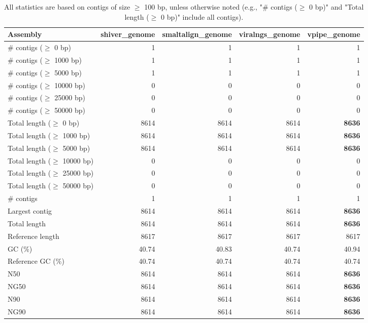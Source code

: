 \documentclass[12pt,a4paper]{article}
\begin{document}
\begin{table}[ht]
\begin{center}
\caption{All statistics are based on contigs of size $\geq$ 100 bp, unless otherwise noted (e.g., "\# contigs ($\geq$ 0 bp)" and "Total length ($\geq$ 0 bp)" include all contigs).}
\begin{tabular}{|l*{4}{|r}|}
\hline
Assembly & shiver\_genome & smaltalign\_genome & viralngs\_genome & vpipe\_genome \\ \hline
\# contigs ($\geq$ 0 bp) & 1 & 1 & 1 & 1 \\ \hline
\# contigs ($\geq$ 1000 bp) & 1 & 1 & 1 & 1 \\ \hline
\# contigs ($\geq$ 5000 bp) & 1 & 1 & 1 & 1 \\ \hline
\# contigs ($\geq$ 10000 bp) & 0 & 0 & 0 & 0 \\ \hline
\# contigs ($\geq$ 25000 bp) & 0 & 0 & 0 & 0 \\ \hline
\# contigs ($\geq$ 50000 bp) & 0 & 0 & 0 & 0 \\ \hline
Total length ($\geq$ 0 bp) & 8614 & 8614 & 8614 & {\bf 8636} \\ \hline
Total length ($\geq$ 1000 bp) & 8614 & 8614 & 8614 & {\bf 8636} \\ \hline
Total length ($\geq$ 5000 bp) & 8614 & 8614 & 8614 & {\bf 8636} \\ \hline
Total length ($\geq$ 10000 bp) & 0 & 0 & 0 & 0 \\ \hline
Total length ($\geq$ 25000 bp) & 0 & 0 & 0 & 0 \\ \hline
Total length ($\geq$ 50000 bp) & 0 & 0 & 0 & 0 \\ \hline
\# contigs & 1 & 1 & 1 & 1 \\ \hline
Largest contig & 8614 & 8614 & 8614 & {\bf 8636} \\ \hline
Total length & 8614 & 8614 & 8614 & {\bf 8636} \\ \hline
Reference length & 8617 & 8617 & 8617 & 8617 \\ \hline
GC (\%) & 40.74 & 40.83 & 40.74 & 40.94 \\ \hline
Reference GC (\%) & 40.74 & 40.74 & 40.74 & 40.74 \\ \hline
N50 & 8614 & 8614 & 8614 & {\bf 8636} \\ \hline
NG50 & 8614 & 8614 & 8614 & {\bf 8636} \\ \hline
N90 & 8614 & 8614 & 8614 & {\bf 8636} \\ \hline
NG90 & 8614 & 8614 & 8614 & {\bf 8636} \\ \hline

\end{tabular}
\end{center}
\end{table}
\end{document}
